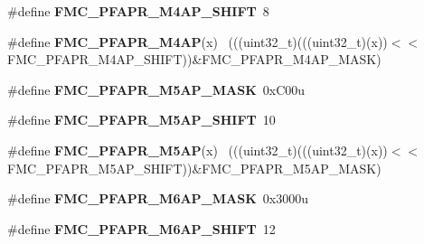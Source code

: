 \begin{DoxyCompactItemize}
\item 
\hypertarget{group___f_m_c___register___masks_gab5d59455fa080c08cf37d632a2b698cc}{}\#define {\bfseries F\+M\+C\+\_\+\+P\+F\+A\+P\+R\+\_\+\+M4\+A\+P\+\_\+\+S\+H\+I\+F\+T}~8\label{group___f_m_c___register___masks_gab5d59455fa080c08cf37d632a2b698cc}

\item 
\hypertarget{group___f_m_c___register___masks_ga5d7440c8374ee7363cc86c2f43199b21}{}\#define {\bfseries F\+M\+C\+\_\+\+P\+F\+A\+P\+R\+\_\+\+M4\+A\+P}(x)                                            ~(((uint32\+\_\+t)(((uint32\+\_\+t)(x))$<$$<$F\+M\+C\+\_\+\+P\+F\+A\+P\+R\+\_\+\+M4\+A\+P\+\_\+\+S\+H\+I\+F\+T))\&F\+M\+C\+\_\+\+P\+F\+A\+P\+R\+\_\+\+M4\+A\+P\+\_\+\+M\+A\+S\+K)\label{group___f_m_c___register___masks_ga5d7440c8374ee7363cc86c2f43199b21}

\item 
\hypertarget{group___f_m_c___register___masks_ga85d2b86b0ca3d8a66162fbf7b5394ad7}{}\#define {\bfseries F\+M\+C\+\_\+\+P\+F\+A\+P\+R\+\_\+\+M5\+A\+P\+\_\+\+M\+A\+S\+K}~0x\+C00u\label{group___f_m_c___register___masks_ga85d2b86b0ca3d8a66162fbf7b5394ad7}

\item 
\hypertarget{group___f_m_c___register___masks_gaf26c0e236405436e3ceb23fa596ce8a5}{}\#define {\bfseries F\+M\+C\+\_\+\+P\+F\+A\+P\+R\+\_\+\+M5\+A\+P\+\_\+\+S\+H\+I\+F\+T}~10\label{group___f_m_c___register___masks_gaf26c0e236405436e3ceb23fa596ce8a5}

\item 
\hypertarget{group___f_m_c___register___masks_gaac6da5fdc65fa1a8eacdd84223d4ea12}{}\#define {\bfseries F\+M\+C\+\_\+\+P\+F\+A\+P\+R\+\_\+\+M5\+A\+P}(x)                                            ~(((uint32\+\_\+t)(((uint32\+\_\+t)(x))$<$$<$F\+M\+C\+\_\+\+P\+F\+A\+P\+R\+\_\+\+M5\+A\+P\+\_\+\+S\+H\+I\+F\+T))\&F\+M\+C\+\_\+\+P\+F\+A\+P\+R\+\_\+\+M5\+A\+P\+\_\+\+M\+A\+S\+K)\label{group___f_m_c___register___masks_gaac6da5fdc65fa1a8eacdd84223d4ea12}

\item 
\hypertarget{group___f_m_c___register___masks_gaa369bff90649d5651eec5c6a306b3502}{}\#define {\bfseries F\+M\+C\+\_\+\+P\+F\+A\+P\+R\+\_\+\+M6\+A\+P\+\_\+\+M\+A\+S\+K}~0x3000u\label{group___f_m_c___register___masks_gaa369bff90649d5651eec5c6a306b3502}

\item 
\hypertarget{group___f_m_c___register___masks_ga20c7a1c28737c267b2210e13f7483628}{}\#define {\bfseries F\+M\+C\+\_\+\+P\+F\+A\+P\+R\+\_\+\+M6\+A\+P\+\_\+\+S\+H\+I\+F\+T}~12\label{group___f_m_c___register___masks_ga20c7a1c28737c267b2210e13f7483628}


\end{DoxyCompactItemize}

